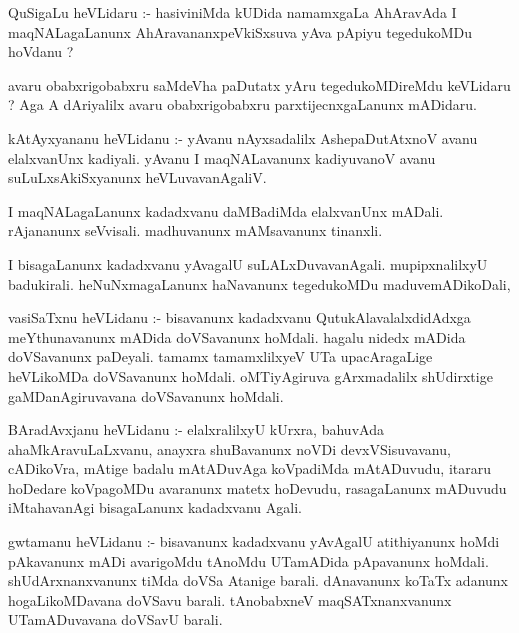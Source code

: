\documentclass{article}
\begin{document}
\begin{mn}
QuSigaLu  heVLidaru :- hasiviniMda  kUDida  namamxgaLa  AhAravAda  I  maqNALagaLanunx 
AhAravananxpeVkiSxsuva  yAva  pApiyu  tegedukoMDu  hoVdanu ?
\end{mn}

\begin{mn}
avaru  obabxrigobabxru  saMdeVha paDutatx  yAru  tegedukoMDireMdu  keVLidaru ?  Aga  A  
dAriyalilx  avaru  obabxrigobabxru  parxtijecnxgaLanunx  mADidaru.
\end{mn}

\begin{mn}
kAtAyxyananu  heVLidanu :- yAvanu  nAyxsadalilx  AshepaDutAtxnoV  avanu  elalxvanUnx  
kadiyali.  yAvanu  I  maqNALavanunx  kadiyuvanoV  avanu  suLuLxsAkiSxyanunx  heVLuvavanAgaliV.
\end{mn}

\begin{mn}
I maqNALagaLanunx  kadadxvanu  daMBadiMda  elalxvanUnx  mADali.  rAjananunx  
seVvisali.  madhuvanunx  mAMsavanunx  tinanxli.
\end{mn}

\begin{mn}
I bisagaLanunx  kadadxvanu  yAvagalU  suLALxDuvavanAgali.  mupipxnalilxyU 
badukirali.  heNuNxmagaLanunx  haNavanunx  tegedukoMDu  maduvemADikoDali,
\end{mn}

\begin{mn}
vasiSaTxnu  heVLidanu :-  bisavanunx  kadadxvanu  QutukAlavalalxdidAdxga  
meYthunavanunx  mADida  doVSavanunx  hoMdali.  hagalu  nidedx mADida  doVSavanunx  
paDeyali.  tamamx tamamxlilxyeV  UTa upacAragaLige  heVLikoMDa  doVSavanunx  hoMdali.  
oMTiyAgiruva  gArxmadalilx  shUdirxtige  gaMDanAgiruvavana  doVSavanunx  hoMdali.
\end{mn}

\begin{mn}
BAradAvxjanu  heVLidanu :- elalxralilxyU  kUrxra,  bahuvAda  ahaMkAravuLaLxvanu,  
anayxra  shuBavanunx  noVDi  devxVSisuvavanu,  cADikoVra,  mAtige  badalu  mAtADuvAga  
koVpadiMda  mAtADuvudu,  itararu  hoDedare  koVpagoMDu  avaranunx  matetx  hoDevudu,  
rasagaLanunx  mADuvudu  iMtahavanAgi  bisagaLanunx  kadadxvanu  Agali.
\end{mn}

\begin{mn}
gwtamanu  heVLidanu :- bisavanunx  kadadxvanu  yAvAgalU  atithiyanunx  hoMdi  pAkavanunx  
mADi  avarigoMdu  tAnoMdu  UTamADida  pApavanunx  hoMdali.  shUdArxnanxvanunx  tiMda doVSa  
Atanige  barali.  dAnavanunx  koTaTx  adanunx  hogaLikoMDavana  doVSavu  barali.  
tAnobabxneV  maqSATxnanxvanunx  UTamADuvavana  doVSavU  barali.
\end{mn}
\end{document}
